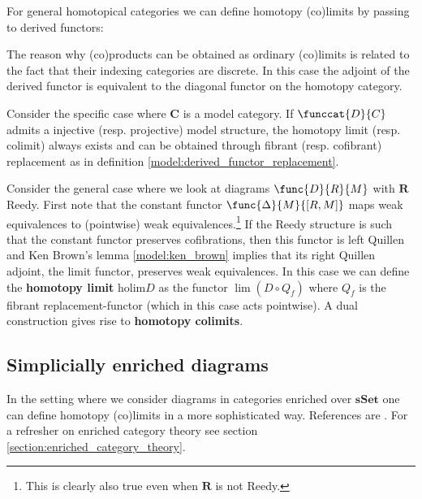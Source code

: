     For general homotopical categories we can define homotopy (co)limits by passing to derived functors:
    \begin{remark}
        The reason why (co)products can be obtained as ordinary (co)limits  is related to the fact that their indexing categories are discrete. In this case the adjoint of the derived functor is equivalent to the diagonal functor on the homotopy category.
    \end{remark}

    \begin{property}
        Consider the specific case where $\mathbf{C}$ is a model category. If $\funccat{D}{C}$ admits a injective (resp. projective) model structure, the homotopy limit (resp. colimit) always exists and can be obtained through fibrant (resp. cofibrant) replacement as in definition \ref{model:derived_functor_replacement}.
    \end{property}
    \begin{example}
        Consider the general case where we look at diagrams $\func{D}{R}{M}$ with $\mathbf{R}$ Reedy. First note that the constant functor $\func{\Delta}{M}{[R,M]}$ maps weak equivalences to (pointwise) weak equivalences.\footnote{This is clearly also true even when $\mathbf{R}$ is not Reedy.} If the Reedy structure is such that the constant functor preserves cofibrations, then this functor is left Quillen and Ken Brown's lemma \ref{model:ken_brown} implies that its right Quillen adjoint, the limit functor, preserves weak equivalences. In this case we can define the \textbf{homotopy limit} $\text{holim} D$ as the functor $\lim(D\circ Q_f)$ where $Q_f$ is the fibrant replacement-functor (which in this case acts pointwise). A dual construction gives rise to \textbf{homotopy colimits}.
    \end{example}

\subsection{Simplicially enriched diagrams}

    In the setting where we consider diagrams in categories enriched over $\mathbf{sSet}$ one can define homotopy (co)limits in a more sophisticated way. References are \cite{hocolim_riehl}. For a refresher on enriched category theory see section \ref{section:enriched_category_theory}.

